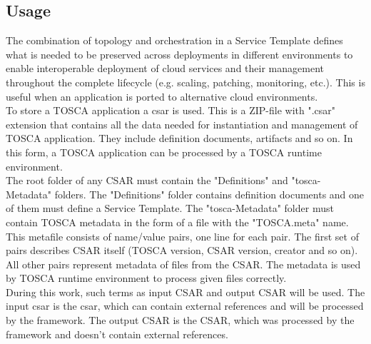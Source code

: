 \subsection*{Usage}
The combination of topology and orchestration in a Service Template defines what is needed to be preserved across deployments in different environments to enable interoperable deployment of cloud services and their management throughout the complete lifecycle (e.g. scaling, patching, monitoring, etc.).
This is useful when an application is ported to alternative cloud environments.~\cite{TOSCA-v1.0_book} \\
%
%
To store a TOSCA application a \gls{csar}\label{sec:csar} is used.
This is a ZIP-file with ".csar" extension that contains all the data needed for instantiation and management of TOSCA application.
They include definition documents, artifacts and so on.
In this form, a TOSCA application can be processed by a TOSCA runtime environment.\\
The root folder of any CSAR must contain the "Definitions" and "\gls{tosca}-Metadata" folders.
The "Definitions" folder contains definition documents and one of them must define a Service Template.
The "\gls{tosca}-Metadata" folder must contain TOSCA metadata in the form of a file with the "TOSCA.meta" name.
This metafile consists of name/value pairs, one line for each pair. 
The first set of pairs describes CSAR itself (TOSCA version, CSAR version, creator and so on). 
All other pairs represent metadata of files from the CSAR. 
The metadata is used by TOSCA runtime environment to process given files correctly.\\
%
During this work, such terms as input CSAR and output CSAR will be used.
The input \gls{csar} is the \gls{csar}, which can contain external references and will be processed by the framework. %
The output CSAR is the CSAR, which was processed by the framework and doesn't contain external references. %

